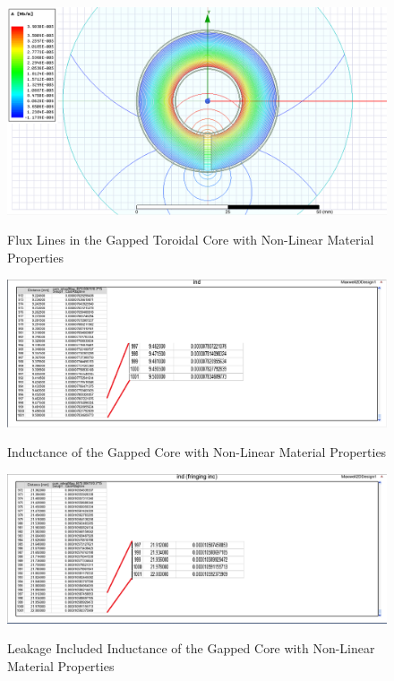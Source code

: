 \begin{enumerate}
\begin{figure}[H]
\hspace{1.5cm}
\centering\includegraphics[width=4.5in]{flux_line_ag.PNG}\\
\caption{Flux Lines in the Gapped Toroidal Core with Non-Linear Material Properties}
\label{flux3}
\end{figure} 

\begin{figure}[H]
\hspace{1.5cm}
\centering\includegraphics[width=4.5in]{inductance_ag.PNG}\\
\caption{Inductance of the Gapped Core with Non-Linear Material Properties}
\label{ind3}
\end{figure}

\begin{figure}[H]
\hspace{1.5cm}
\centering\includegraphics[width=4.5in]{overall_inductance_ag.PNG}\\
\caption{Leakage Included Inductance of the Gapped Core with Non-Linear Material Properties}
\label{leak2}
\end{figure}

\end{enumerate}

